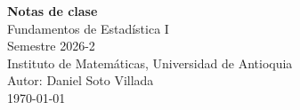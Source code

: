 \documentclass[12pt]{report}
\begin{document}
\begin{center}
    {\Large\textbf{Notas de clase}}\\[0.3em]
    {\large Fundamentos de Estadística I}\\
    Semestre 2026-2\\
    Instituto de Matemáticas, Universidad de Antioquia\\
    Autor: Daniel Soto Villada\\
    \today
\end{center}

\begingroup
\let\clearpage\relax
\let\cleardoublepage\relax
\tableofcontents
\endgroup






\end{document}
